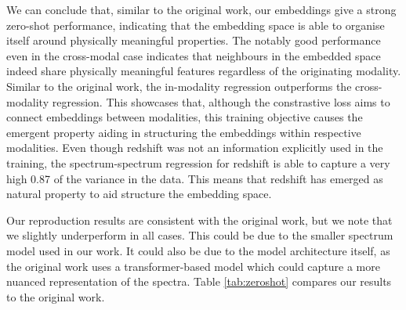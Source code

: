 \documentclass[a4paper,12pt]{article}
\begin{document}
We can conclude that, similar to the original work, our embeddings give a strong zero-shot performance, indicating that the embedding space is able to organise itself around physically meaningful properties. The notably good performance even in the cross-modal case indicates that neighbours in the embedded space indeed share physically meaningful features regardless of the originating modality. Similar to the original work, the in-modality regression outperforms the cross-modality regression. This showcases that, although the constrastive loss aims to connect embeddings between modalities, this training objective causes the emergent property aiding in structuring the embeddings within respective modalities. Even though redshift was not an information explicitly used in the training, the spectrum-spectrum regression for redshift is able to capture a very high 0.87 of the variance in the data. This means that redshift has emerged as natural property to aid structure the embedding space.

Our reproduction results are consistent with the original work, but we note that we slightly underperform in all cases. This could be due to the smaller spectrum model used in our work. It could also be due to the model architecture itself, as the original work uses a transformer-based model which could capture a more nuanced representation of the spectra. Table \ref{tab:zeroshot} compares our results to the original work.
\end{document}
